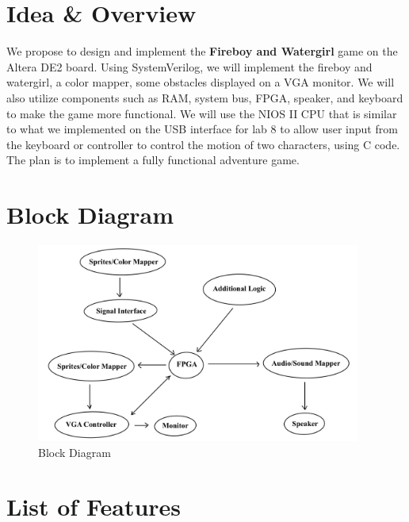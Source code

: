 \documentclass[a4paper]{article}
\begin{document}
\newpage


\large
\section{Idea \& Overview}
We propose to design and implement the \textbf{Fireboy and Watergirl} game on the Altera DE2 board. Using SystemVerilog, we will implement the fireboy and watergirl, a color mapper, some obstacles displayed on a VGA monitor. We will also utilize components such as RAM, system bus, FPGA, speaker, and keyboard to make the game more functional. 
We will use the NIOS II CPU that is similar to what we implemented on the USB interface for lab 8 to allow user input from the keyboard or controller to control the motion of two characters, using C code. The plan is to implement a fully functional adventure game.
\section{Block Diagram}
\begin{figure}[ht]
    \centering
    \includegraphics[width = 0.95\textwidth]{images/block diagram.jpeg}
    \caption{Block Diagram}
\end{figure}
\section{List of Features}
\end{document}
